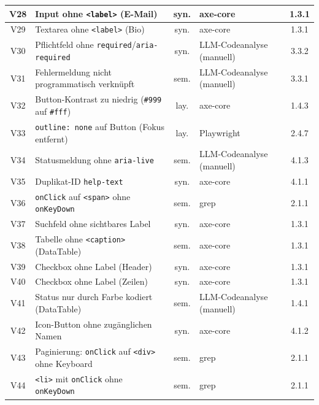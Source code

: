 \begin{longtable}{|c|p{6.4cm}|c|p{4.0cm}|c|}
V28 & Input ohne \texttt{<label>} (E-Mail)                          & syn. & axe-core                & 1.3.1 \\ \hline
V29 & Textarea ohne \texttt{<label>} (Bio)                          & syn. & axe-core                & 1.3.1 \\ \hline
V30 & Pflichtfeld ohne \texttt{required}/\texttt{aria-required}     & syn. & \ac{LLM}-Codeanalyse (manuell)& 3.3.2 \\ \hline
V31 & Fehlermeldung nicht programmatisch verknüpft                  & sem. & \ac{LLM}-Codeanalyse (manuell)& 3.3.1 \\ \hline
V32 & Button-Kontrast zu niedrig (\texttt{\#999} auf \texttt{\#fff})& lay. & axe-core                & 1.4.3 \\ \hline
V33 & \texttt{outline: none} auf Button (Fokus entfernt)            & lay. & Playwright              & 2.4.7 \\ \hline
V34 & Statusmeldung ohne \texttt{aria-live}                         & sem. & \ac{LLM}-Codeanalyse (manuell)& 4.1.3 \\ \hline
V35 & Duplikat-ID \texttt{help-text}                                & syn. & axe-core                & 4.1.1 \\ \hline
V36 & \texttt{onClick} auf \texttt{<span>} ohne \texttt{onKeyDown}  & sem. & grep                    & 2.1.1 \\ \hline
V37 & Suchfeld ohne sichtbares Label                                & syn. & axe-core                & 1.3.1 \\ \hline
V38 & Tabelle ohne \texttt{<caption>} (DataTable)                   & sem. & axe-core                & 1.3.1 \\ \hline
V39 & Checkbox ohne Label (Header)                                  & syn. & axe-core                & 1.3.1 \\ \hline
V40 & Checkbox ohne Label (Zeilen)                                  & syn. & axe-core                & 1.3.1 \\ \hline
V41 & Status nur durch Farbe kodiert (DataTable)                    & sem. & \ac{LLM}-Codeanalyse (manuell)& 1.4.1 \\ \hline
V42 & Icon-Button ohne zugänglichen Namen                           & syn. & axe-core                & 4.1.2 \\ \hline
V43 & Paginierung: \texttt{onClick} auf \texttt{<div>} ohne Keyboard& sem. & grep                    & 2.1.1 \\ \hline
V44 & \texttt{<li>} mit \texttt{onClick} ohne \texttt{onKeyDown}    & sem. & grep                    & 2.1.1 \\ \hline

\end{longtable}

